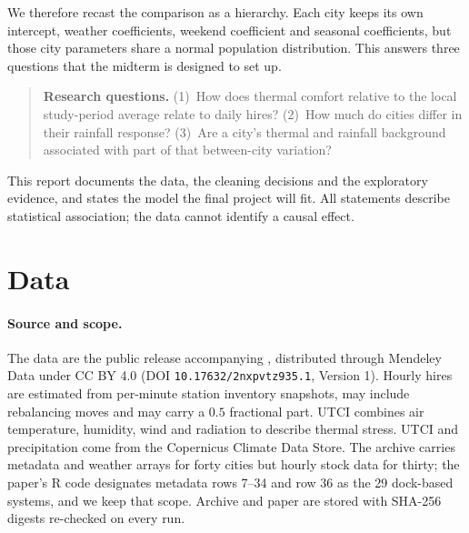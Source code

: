 \documentclass{article}
\begin{document}
We therefore recast the comparison as a hierarchy. Each city keeps its own
intercept, weather coefficients, weekend coefficient and seasonal coefficients,
but those city parameters share a normal population distribution. This answers
three questions that the midterm is designed to set up.

\begin{quote}
\textbf{Research questions.} (1)~How does thermal comfort relative to the local
study-period average relate to daily hires? (2)~How much do cities differ in
their rainfall response? (3)~Are a city's thermal and rainfall background
associated with part of that between-city variation?
\end{quote}

This report documents the data, the cleaning decisions and the exploratory
evidence, and states the model the final project will fit. All statements
describe statistical association; the data cannot identify a causal effect.

\section{Data}
\label{sec:data}

\paragraph{Source and scope.} The data are the public release accompanying
\citet{bean2021weather}, distributed through Mendeley Data
\citep{mendeley2021bikeshare} under CC BY 4.0 (DOI
\texttt{10.17632/2nxpvtz935.1}, Version 1). Hourly hires are estimated from
per-minute station inventory snapshots, may include rebalancing moves and may
carry a $0.5$ fractional part. UTCI combines air temperature, humidity, wind and
radiation to describe thermal stress. UTCI and precipitation come from the
Copernicus Climate Data Store. The archive
carries metadata and weather arrays for forty cities but hourly stock data for
thirty; the paper's R code designates metadata rows 7--34 and row 36 as the 29
dock-based systems, and we keep that scope. Archive and paper
are stored with SHA-256 digests re-checked on every run.
\end{document}
